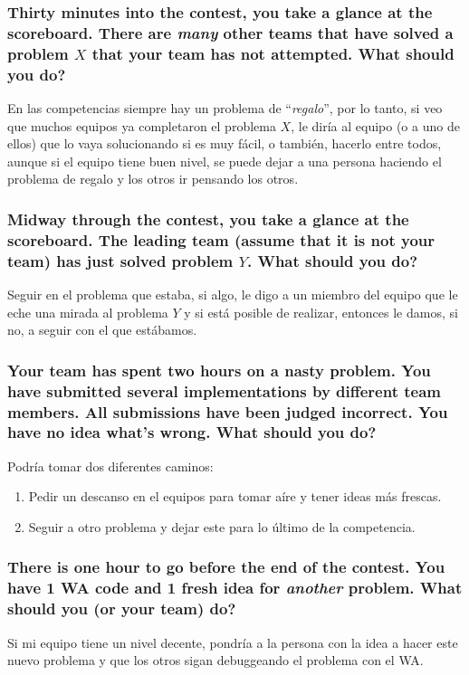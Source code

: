 \documentclass{article}
\begin{document}
\subsubsection{Thirty minutes into the contest, you take a glance at the scoreboard. There are \textit{many} other teams that have solved a problem $X$ that your team has not attempted. What should you do?}


En las competencias siempre hay un problema de ``\textit{regalo}'', por lo tanto, si veo que muchos equipos ya completaron el problema $X$, le diría al equipo (o a uno de ellos) que lo vaya solucionando si es muy fácil, o también, hacerlo entre todos, aunque si el equipo tiene buen nivel, se puede dejar a una persona haciendo el problema de regalo y los otros ir pensando los otros.


\subsubsection{Midway through the contest, you take a glance at the scoreboard. The leading team (assume that it is not your team) has just solved problem $Y$. What should you do?}


Seguir en el problema que estaba, si algo, le digo a un miembro del equipo que le eche una mirada al problema $Y$ y si está posible de realizar, entonces le damos, si no, a seguir con el que estábamos.

\subsubsection{Your team has spent two hours on a nasty problem. You have submitted several implementations by different team members. All submissions have been judged incorrect. You have no idea what's wrong. What should you do?}


Podría tomar dos diferentes caminos:

\begin{enumerate}
  \item Pedir un descanso en el equipos para tomar aíre y tener ideas más frescas.
  \item Seguir a otro problema y dejar este para lo último de la competencia.
\end{enumerate}


\subsubsection{There is one hour to go before the end of the contest. You have 1 WA code and 1 fresh idea for \textit{another} problem. What should you (or your team) do?}

Si mi equipo tiene un nivel decente, pondría a la persona con la idea a hacer este nuevo problema y que los otros sigan debuggeando el problema con el WA.
\end{document}
